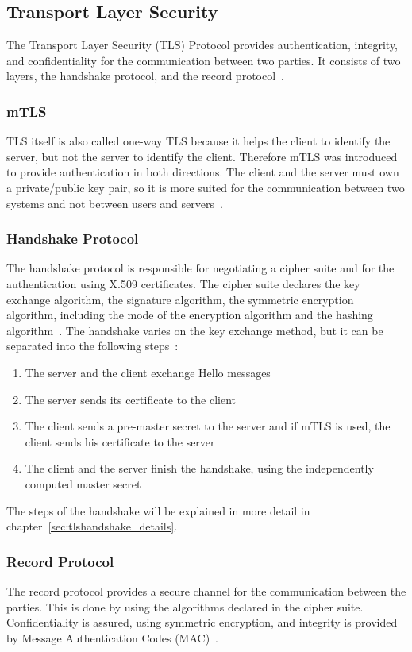 \subsection{Transport Layer Security}
The Transport Layer Security (TLS) Protocol provides authentication, integrity, and confidentiality for the communication between two parties.
It consists of two layers, the handshake protocol, and the record protocol~\cite{turnertls}.

\subsubsection{mTLS} \label{sec:mtls}
TLS itself is also called one-way TLS because it helps the client to identify the server, but not the server to identify the client.
Therefore mTLS was introduced to provide authentication in both directions.
The client and the server must own a private/public key pair, so it is more suited for the communication between two systems and not between users and servers~\cite{dias2020microservices}. 

\subsubsection{Handshake Protocol}
The handshake protocol is responsible for negotiating a cipher suite and for the authentication using X.509 certificates.
The cipher suite declares the key exchange algorithm, the signature algorithm, the symmetric encryption algorithm, including the mode of the encryption algorithm and the hashing algorithm~\cite{turnertls, kurbatov2021design}.
The handshake varies on the key exchange method, but it can be separated into the following steps~\cite{krawczyk2013security}:
\begin{enumerate}
    \item The server and the client exchange Hello messages
    \item The server sends its certificate to the client
    \item The client sends a pre-master secret to the server and if mTLS is used, the client sends his certificate to the server
    \item The client and the server finish the handshake, using the independently computed master secret
\end{enumerate}
The steps of the handshake will be explained in more detail in chapter~\ref{sec:tlshandshake_details}.

\subsubsection{Record Protocol}
The record protocol provides a secure channel for the communication between the parties.
This is done by using the algorithms declared in the cipher suite.
Confidentiality is assured, using symmetric encryption, and integrity is provided by Message Authentication Codes (MAC)~\cite{kurbatov2021design, krawczyk2013security}.

